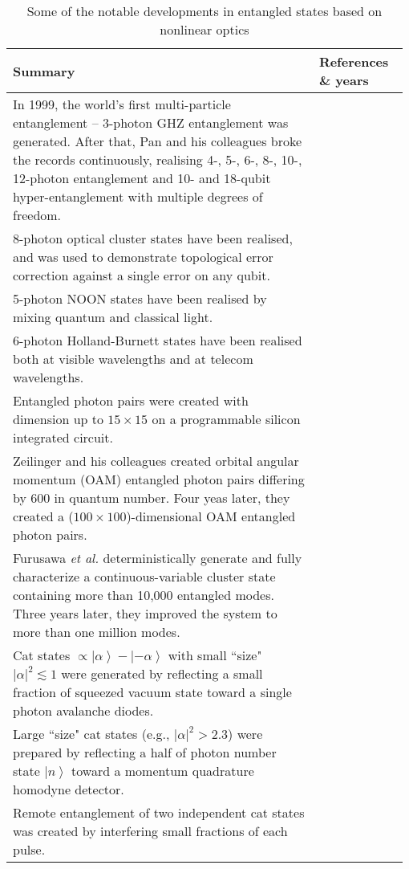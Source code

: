 \begin{table*}[!htbp]
	\begin{tabular}{|p{0.755\linewidth}|p{0.22\linewidth}|}
		\hline
		Summary & References \& years \\
		\hline \hline
        In 1999, the world's first multi-particle entanglement -- 3-photon GHZ entanglement was generated. After that, Pan and his colleagues broke the records continuously, realising 4-, 5-, 6-, 8-, 10-, 12-photon entanglement and 10- and 18-qubit hyper-entanglement with multiple degrees of freedom. & \cite{bib:bouwmeester1999observation,  bib:wang201818, bib:zhong201812}  \\
		\hline
		8-photon optical cluster states have been realised, and was used to demonstrate topological error correction against a single error on any qubit. &  \cite{bib:yao2012experimental}  \\
		\hline
		5-photon NOON states have been realised by mixing quantum and classical light. & \cite{bib:afek2010high} \\
		\hline
		6-photon Holland-Burnett states have been realised both at visible wavelengths and at telecom wavelengths. & \cite{bib:xiang2012optimal,  bib:jin2016detection} \\
		\hline
		Entangled photon pairs were created with dimension up to \mbox{$15\times 15$} on a programmable silicon integrated circuit. & \cite{bib:wang2018multidimensional} \\
		\hline
		Zeilinger and his colleagues created orbital angular momentum (OAM) entangled photon pairs differing by 600 in quantum number. Four yeas later, they created a ($100\times 100$)-dimensional OAM entangled photon pairs. & \cite{bib:fickler2012quantum} \\
		\hline
		Furusawa \textit{et al.} deterministically generate and fully characterize a continuous-variable cluster state containing more than 10,000 entangled modes. Three years later, they improved the system to more than one million modes. & \cite{bib:yokoyama2013ultra, bib:yoshikawa2016invited} \\
		\hline
        Cat states $\propto \left| \alpha  \right\rangle  - \left| { - \alpha } \right\rangle $ with small ``size" ${\left| \alpha  \right|^2} \lesssim 1$ were generated by reflecting a small fraction of squeezed vacuum state toward a single photon avalanche diodes. & \cite{bib:neergaard2006generation,  bib:ourjoumtsev2006generating,  bib:wakui2007photon} \\
        \hline
        Large ``size" cat states (e.g., ${\left| \alpha  \right|^2} > 2.3$) were prepared by reflecting a half of photon number state $\left| n \right\rangle$ toward a momentum quadrature homodyne detector. & \cite{bib:ourjoumtsev2007generation, bib:takahashi2008generation} \\
		\hline
		Remote entanglement of two independent cat states was created by interfering small fractions of each pulse. & \cite{bib:ourjoumtsev2009preparation} \\
		\hline
	\end{tabular}
	\captionspacetab \caption{Some of the notable developments in entangled states based on nonlinear optics} \label{tab:entangled_states}
\end{table*}

